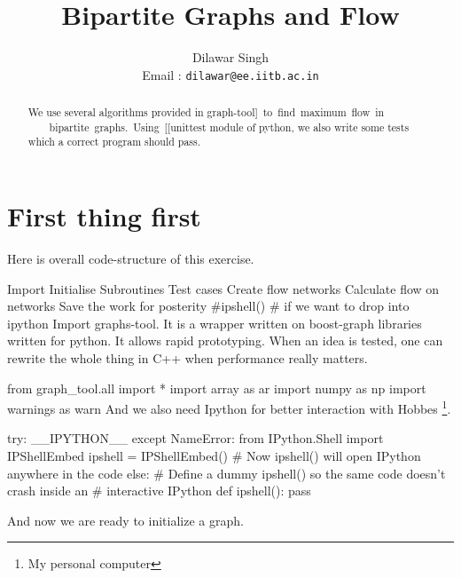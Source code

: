\documentclass[10pt,a4paper]{article}%
\author{Dilawar Singh \\
Email : \texttt{dilawar@ee.iitb.ac.in}}
\title{Bipartite Graphs and Flow}
\begin{document}
\nwdocspar
\pagestyle{noweb}
\maketitle
\begin{abstract}
    
    We use several algorithms provided in {\Tt{}graph-tool]\ to\ find\ maximum\ flow\ in\nwnewline
\ \ \ \ bipartite\ graphs.\ Using\ [[unittest\nwendquote} module of python, we also write some
    tests which a correct program should pass. 

\end{abstract}

\nwenddocs{}\section{First thing first}

Here is overall code-structure of this exercise.

\nwenddocs{}\moddef{*}\endmoddef\nwstartdeflinemarkup\nwenddeflinemarkup
\LA{}Import\RA{}
\LA{}Initialise\RA{}
\LA{}Subroutines\RA{}
\LA{}Test cases\RA{}
\LA{}Create flow networks\RA{}
\LA{}Calculate flow on networks\RA{}
\LA{}Save the work for posterity\RA{}
#ipshell() # if we want to drop into ipython
\eatline
\nwendcode{}\nwdocspar
    Import {\Tt{}graphs-tool\nwendquote}. It is a wrapper written on boost-graph libraries
    written for python. It allows rapid prototyping. When an idea is tested, one
    can rewrite the whole thing in C++ when performance really matters.


\nwenddocs{}\endmoddef\nwstartdeflinemarkup\nwenddeflinemarkup
from graph_tool.all import * 
import array as ar
import numpy as np
import warnings as warn
\nwendcode{}And we also need {\Tt{}Ipython\nwendquote} for better interaction with Hobbes \footnote{My
personal computer}.

\nwenddocs{}\plusendmoddef\nwstartdeflinemarkup\nwenddeflinemarkup
try:
    __IPYTHON__
except NameError:
    from IPython.Shell import IPShellEmbed
    ipshell = IPShellEmbed()
    # Now ipshell() will open IPython anywhere in the code
else:
    # Define a dummy ipshell() so the same code doesn't crash inside an
    # interactive IPython
    def ipshell(): pass

\nwendcode{}And now we are ready to initialize a graph.
\end{document}
